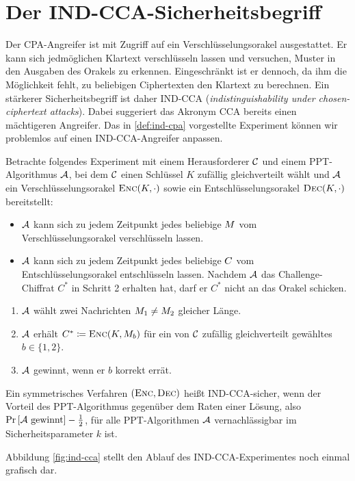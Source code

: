 \section{Der IND-CCA-Sicherheitsbegriff}\label{sec:ind-cca}
Der CPA-Angreifer ist mit Zugriff auf ein Verschlüsselungsorakel ausgestattet. Er kann sich jedmöglichen Klartext verschlüsseln lassen und
versuchen, Muster in den Ausgaben des Orakels zu erkennen. Eingeschränkt ist er dennoch, da ihm die Möglichkeit fehlt, zu beliebigen
Ciphertexten den Klartext zu berechnen. Ein stärkerer Sicherheitsbegriff ist daher IND-CCA (\emph{indistinguishability under chosen-ciphertext attacks}). Dabei suggeriert das Akronym CCA bereits einen mächtigeren Angreifer. Das in \ref{def:ind-cpa} vorgestellte Experiment können wir problemlos auf einen IND-CCA-Angreifer anpassen.

\begin{definition}
	Betrachte folgendes Experiment mit einem Herausforderer $\mathcal{C}$ und einem PPT-Algorithmus $\mathcal{A}$, bei dem $\mathcal{C}$ einen Schlüssel $K$ zufällig gleichverteilt wählt und $\mathcal{A}$ ein Verschlüsselungsorakel $\textsc{Enc}(K,\cdot)$ sowie ein Entschlüsselungsorakel $\textsc{Dec}(K,\cdot)$ bereitstellt:
	\begin{itemize}
		\item $\mathcal{A}$ kann sich zu jedem Zeitpunkt jedes beliebige $M$ vom Verschlüsselungsorakel verschlüsseln lassen.
		\item $\mathcal{A}$ kann sich zu jedem Zeitpunkt jedes beliebige
                  $C$ vom Entschlüsselungsorakel entschlüsseln
                  lassen. Nachdem $\mathcal{A}$ das Challenge-Chiffrat $C^*$ in Schritt 2 erhalten hat,
                  darf er $C^*$ nicht an das Orakel schicken.
	\end{itemize}
	\begin{enumerate}
		\item $\mathcal{A}$ wählt zwei Nachrichten $M_1 \neq M_2$ gleicher Länge.
		\item $\mathcal{A}$ erhält $C^{\ast} \coloneqq \textsc{Enc}(K, M_{b})$ für ein von $\mathcal{C}$ zufällig gleichverteilt gewähltes $b \in \{1, 2\}$.
		\item $\mathcal{A}$ gewinnt, wenn er $b$ korrekt errät.
	\end{enumerate}
	Ein symmetrisches Verfahren $(\textsc{Enc}, \textsc{Dec})$ heißt IND-CCA-sicher, wenn der Vorteil des
        PPT-Algorithmus gegenüber dem Raten einer Lösung, also $\Pr
        \left[\mathcal{A} \textnormal{ gewinnt} \right] - \frac{1}{2}$, für alle
        PPT-Algorithmen $\mathcal{A}$ vernachlässigbar im Sicherheitsparameter $k$ ist. 
\end{definition}
Abbildung \ref{fig:ind-cca} stellt den Ablauf des IND-CCA-Experimentes
noch einmal grafisch dar.

